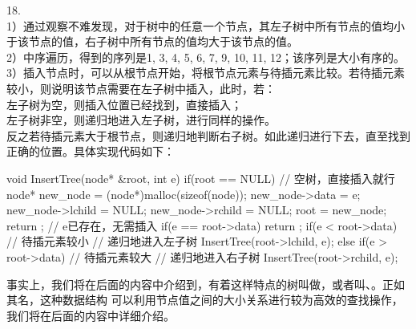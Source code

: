 \begin{exerciseanswer}
18. \\1）通过观察不难发现，对于树中的任意一个节点，其左子树中所有节点的值均小于该节点的值，右子树中所有节点的值均大于该节点的值。\\
2）中序遍历，得到的序列是1, 3, 4, 5, 6, 7, 9, 10, 11, 12；该序列是大小有序的。\\
3）插入节点时，可以从根节点开始，将根节点元素与待插元素比较。若待插元素较小，则说明该节点需要在左子树中插入，此时，若：\\
 左子树为空，则插入位置已经找到，直接插入；\\
 左子树非空，则递归地进入左子树，进行同样的操作。\\
反之若待插元素大于根节点，则递归地判断右子树。如此递归进行下去，直至找到正确的位置。具体实现代码如下：
\begin{cppcode}
    void InsertTree(node* &root, int e) {
        if(root == NULL) {
            // 空树，直接插入就行
            node* new_node = (node*)malloc(sizeof(node));
            new_node->data = e;
            new_node->lchild = NULL;
            new_node->rchild = NULL;
            root = new_node;
            return ;
        }
        // e已存在，无需插入
        if(e == root->data) {
            return ;
        }
        if(e < root->data) {   // 待插元素较小
            // 递归地进入左子树
            InsertTree(root->lchild, e);    
        } 
        else if(e > root->data) {    // 待插元素较大
            // 递归地进入右子树
            InsertTree(root->rchild, e);    
        }
    }
\end{cppcode}
事实上，我们将在后面的内容中介绍到，有着这样特点的树叫做，或者叫、。正如其名，这种数据结构
可以利用节点值之间的大小关系进行较为高效的查找操作，我们将在后面的内容中详细介绍。

\end{exerciseanswer}%